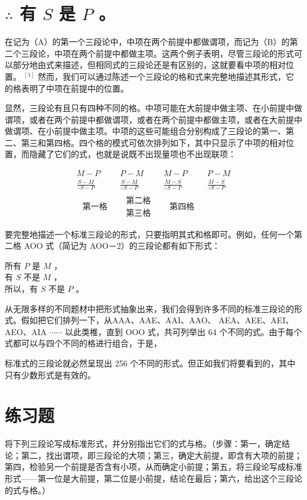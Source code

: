 \section*{$\therefore$ 有 $S$ 是 $P$ 。}
在记为（A）的第一个三段论中，中项在两个前提中都做谓项，而记为（B）的第二个三段论，中项在两个前提中都做主项。这两个例子表明，尽管三段论的形式可以部分地由式来描述，但相同式的三段论还是有区别的，这就要看中项的相对位置。 ${ }^{[1]}$ 然而，我们可以通过陈述一个三段论的格和式来完整地描述其形式，它的格表明了中项在前提中的位置。

显然，三段论有且只有四种不同的格。中项可能在大前提中做主项、在小前提中做谓项，或者在两个前提中都做谓项，或者在两个前提中都做主项，或者在大前提中做谓项、在小前提中做主项。中项的这些可能组合分别构成了三段论的第一、第二、第三和第四格。四个格的模式可依次排列如下，其中只显示了中项的相对位置，而隐藏了它们的式，也就是说既不出现量项也不出现联项：

$$
\begin{array}{llll}
M-P & P-M & M-P & P-M \\
\frac{S-M}{\therefore S-P} & \frac{S-M}{\therefore S-P} & \frac{M-S}{\therefore S-P} & \frac{M-S}{\therefore S-P} \\
\begin{array}{l}
\text { 第一格 }
\end{array} & \begin{array}{l}
\text { 第二格 } \\
\text { 第三格 }
\end{array} & \begin{array}{l}
\text { 第四格 }
\end{array}
\end{array}
$$

要完整地描述一个标准三段论的形式，只要指明其式和格即可。例如，任何一个第二格 AOO 式（简记为 AOO－2）的三段论都有如下形式：

所有 $P$ 是 $M$ ，\\
有 $S$ 不是 $M$ ，\\
所以，有 $S$ 不是 $P$ 。

从无限多样的不同题材中把形式抽象出来，我们会得到许多不同的标准三段论的形式。假如把它们排列一下，从AAA、AAE、AAI、AAO、 AEA、AEE、AEI、AEO、AIA $\cdots \cdots$ 以此类椎，直到 OOO 式，共可列举出 64 个不同的式。由于每个式都可以与四个不同的格进行组合，于是，

标准式的三段论就必然呈现出 256 个不同的形式。但正如我们将要看到的，其中只有少数形式是有效的。

\section*{练习题}
将下列三段论写成标准形式，并分别指出它们的式与格。（步骤：第一，确定结论；第二，找出谓项，即三段论的大项；第三，确定大前提，即含有大项的前提；第四，检验另一个前提是否含有小项，从而确定小前提；第五，将三段论写成标准形式——第一位是大前提，第二位是小前提，结论在最后；第六，给出这个三段论的式与格。）

